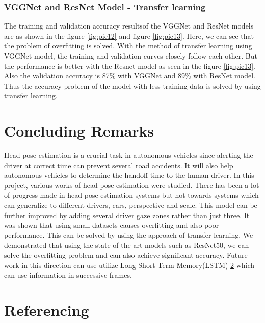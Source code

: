 \documentclass[a4paper, 12pt, oneside, BCOR1cm,toc=chapterentrywithdots]{scrbook}
\begin{document}
\subsection{VGGNet and ResNet Model - Transfer learning}

The training and validation accuracy resultsof the VGGNet and ResNet models are as shown in the figure \ref{fig:pic12} and figure \ref{fig:pic13}. Here, we can see that the problem of overfitting is solved. With the method of transfer learning using VGGNet model, the training and validation curves closely follow each other. But the performance is better with the Resnet model as seen in the figure \ref{fig:pic13}. Also the validation accuracy is 87\% with VGGNet and 89\% with ResNet model. Thus the accuracy problem of the model with less training data is solved by using transfer learning. 



\chapter{Concluding Remarks}

Head pose estimation is a crucial task in autonomous vehicles since alerting the driver at correct time can prevent several road accidents. It will also help autonomous vehicles to determine the handoff time to the human driver. In this project, various works of head pose estimation were studied. There has been a lot of progress made in head pose estimation systems but not towards systems which can generalize to different drivers, cars, perspective and scale. This model can be further improved by adding several driver gaze zones rather than just three. It was shown that using small datasets causes overfitting and also poor performance. This can be solved by using the approach of transfer learning. We demonstrated that using the state of the art models such as ResNet50, we can solve the overfitting problem and can also achieve significant accuracy. Future work in this direction can use utilize Long Short Term Memory(LSTM) \ref{} which can use information in successive frames. 
 

\chapter{Referencing}
\end{document}
